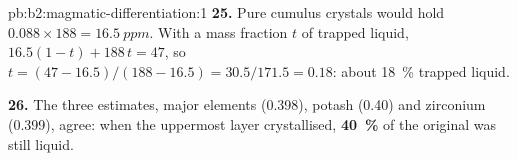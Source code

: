 \begin{solution}{pb:b2:magmatic-differentiation:1}
\textbf{25.} Pure cumulus crystals would hold $0.088\times188 = \qty{16.5}{ppm}$. With a
mass fraction $t$ of trapped liquid, $16.5(1 - t) + 188\,t = 47$, so $t = (47 -
16.5)/(188 - 16.5) = 30.5/171.5 = 0.18$: about \qty{18}{\percent} trapped liquid.

\textbf{26.} The three estimates, major elements (0.398), potash (0.40) and
zirconium (0.399), agree: when the uppermost layer crystallised,
\textbf{\qty[text-series-to-math=true]{40}{\percent}} of the original  was
still liquid.
\end{solution}
